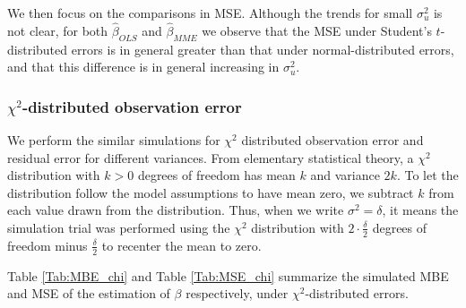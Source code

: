 \documentclass{article}
\begin{document}
We then focus on the comparisons in MSE.
Although the trends for small $\sigma^2_u$ is not clear, for both $\hat{\beta}_{OLS}$ and $\hat{\beta}_{MME}$
we observe that the MSE under Student's $t$-distributed errors is in general greater than that under normal-distributed errors,
and that this difference is in general increasing in $\sigma^2_u$.

\subsubsection{$\chi^2$-distributed observation error}

We perform the similar simulations for $\chi^2$ distributed observation error and residual error for different variances.
From elementary statistical theory, a $\chi^2$ distribution with $k > 0$ degrees of freedom has mean $k$ and variance $2k$.
To let the distribution follow the model assumptions to have mean zero, we subtract $k$ from each value drawn from the distribution.
Thus, when we write $\sigma^2 = \delta$, it means the simulation trial was performed using the $\chi^2$ distribution with $2 \cdot \frac{\delta}{2}$ degrees of freedom minus $\frac{\delta}{2}$ to recenter the mean to zero.

Table \ref{Tab:MBE_chi} and Table \ref{Tab:MSE_chi} summarize the simulated MBE and MSE of the estimation of $\beta$ respectively, under $\chi^2$-distributed errors.
\end{document}

